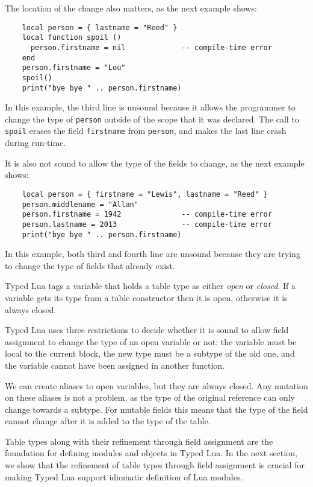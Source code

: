 The location of the change also matters, as the next example shows:
\begin{verbatim}
    local person = { lastname = "Reed" }
    local function spoil ()
      person.firstname = nil             -- compile-time error
    end
    person.firstname = "Lou"
    spoil()
    print("bye bye " .. person.firstname)
\end{verbatim}

In this example, the third line is unsound because it allows the
programmer to change the type of \texttt{person} outside of the scope
that it was declared.
The call to \texttt{spoil} erases the field \texttt{firstname} from
\texttt{person}, and makes the last line crash during run-time.

It is also not sound to allow the type of the fields to change,
as the next example shows:
\begin{verbatim}
    local person = { firstname = "Lewis", lastname = "Reed" }
    person.middlename = "Allan"
    person.firstname = 1942              -- compile-time error
    person.lastname = 2013               -- compile-time error
    print("bye bye " .. person.firstname)
\end{verbatim}

In this example, both third and fourth line are unsound because
they are trying to change the type of fields that already exist.

Typed Lua tags a variable that holds a table type as either
\emph{open} or \emph{closed}.
If a variable gets its type from a table constructor then it
is open, otherwise it is always closed.

Typed Lua uses three restrictions to decide whether it is
sound to allow field assignment to change the type of an
open variable or not:
the variable must be local to the current block,
the new type must be a subtype of the old one, and
the variable cannot have been assigned in another function.

We can create aliases to open variables, but they are always closed.
Any mutation on these aliases is not a problem, as the type of
the original reference can only change towards a subtype.
For mutable fields this means that the type of the field cannot
change after it is added to the type of the table.

Table types along with their refinement through field assignment
are the foundation for defining modules and objects in Typed Lua.
In the next section, we show that the refinement of table types
through field assignment is crucial for making Typed Lua
support idiomatic definition of Lua modules.

